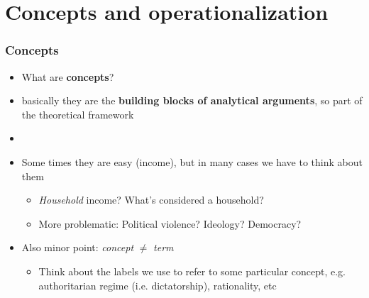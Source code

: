 \documentclass[aspectratio=43]{beamer}
\begin{document}
\section{Concepts and operationalization}

\begin{frame}
\frametitle{Concepts}
\centering

\begin{itemize}
  \item What are \textbf{concepts}?
  \item basically they are the \textbf{building blocks of analytical arguments}, so part of the theoretical framework
  \item[]
  \item<2-> Some times they are easy (income), but in many cases we have to think about them
  \begin{itemize}
    \item \textit{Household} income? What's considered a household?
    \item More problematic: Political violence? Ideology? Democracy? 
  \end{itemize}
  \item<3-> Also minor point: \textit{concept} $\neq$ \textit{term}
  \begin{itemize}
    \item Think about the labels we use to refer to some particular concept, e.g. authoritarian regime (i.e. dictatorship), rationality, etc
  \end{itemize}
\end{itemize}


\end{frame}
\end{document}
